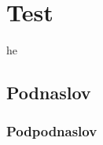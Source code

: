 \chapter{Test}
 he \blindtext[1]
 
 \section{Podnaslov}
 \blindtext[2]
 \subsection{Podpodnaslov}
 \blindtext[1]